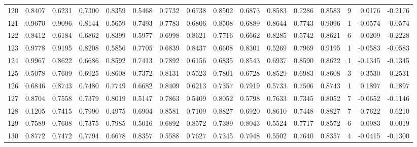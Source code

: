 \begin{tabular}{lrrrrrrrrrrrrrrr}
120 &      0.8407 &  0.6231 &  0.7300 &  0.8359 &  0.5468 &  0.7732 &  0.6738 &  0.8502 &  0.6873 &  0.8583 &   0.7286 &     0.8583 &      9 &                    0.0176 &                    -0.2176 \\
121 &      0.9670 &  0.9096 &  0.8144 &  0.5659 &  0.7493 &  0.7783 &  0.6806 &  0.8508 &  0.6889 &  0.8644 &   0.7743 &     0.9096 &      1 &                   -0.0574 &                    -0.0574 \\
122 &      0.8412 &  0.6184 &  0.6862 &  0.8399 &  0.5977 &  0.6998 &  0.8621 &  0.7716 &  0.6662 &  0.8285 &   0.5742 &     0.8621 &      6 &                    0.0209 &                    -0.2228 \\
123 &      0.9778 &  0.9195 &  0.8208 &  0.5856 &  0.7705 &  0.6839 &  0.8437 &  0.6608 &  0.8301 &  0.5269 &   0.7969 &     0.9195 &      1 &                   -0.0583 &                    -0.0583 \\
124 &      0.9967 &  0.8622 &  0.6686 &  0.8592 &  0.7413 &  0.7892 &  0.6156 &  0.6835 &  0.8543 &  0.6937 &   0.8590 &     0.8622 &      1 &                   -0.1345 &                    -0.1345 \\
125 &      0.5078 &  0.7609 &  0.6925 &  0.8608 &  0.7372 &  0.8131 &  0.5523 &  0.7801 &  0.6728 &  0.8529 &   0.6983 &     0.8608 &      3 &                    0.3530 &                     0.2531 \\
126 &      0.6846 &  0.8743 &  0.7480 &  0.7749 &  0.6682 &  0.8409 &  0.6213 &  0.7357 &  0.7919 &  0.5733 &   0.7506 &     0.8743 &      1 &                    0.1897 &                     0.1897 \\
127 &      0.8704 &  0.7558 &  0.7379 &  0.8019 &  0.5147 &  0.7863 &  0.5409 &  0.8052 &  0.5798 &  0.7633 &   0.7345 &     0.8052 &      7 &                   -0.0652 &                    -0.1146 \\
128 &      0.1205 &  0.7415 &  0.7990 &  0.4975 &  0.6904 &  0.8581 &  0.7109 &  0.8827 &  0.6920 &  0.8610 &   0.7448 &     0.8827 &      7 &                    0.7622 &                     0.6210 \\
129 &      0.7589 &  0.7608 &  0.7375 &  0.7985 &  0.5016 &  0.6892 &  0.8572 &  0.7389 &  0.8043 &  0.5524 &   0.7717 &     0.8572 &      6 &                    0.0983 &                     0.0019 \\
130 &      0.8772 &  0.7472 &  0.7794 &  0.6678 &  0.8357 &  0.5588 &  0.7627 &  0.7345 &  0.7948 &  0.5502 &   0.7640 &     0.8357 &      4 &                   -0.0415 &                    -0.1300 \\

\end{tabular}
